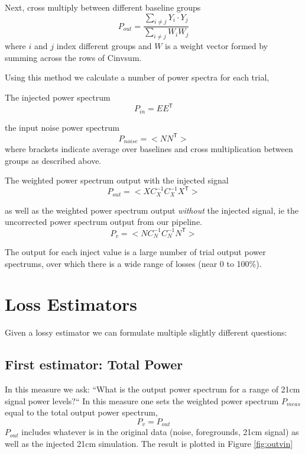 \documentclass{article}
\begin{document}
Next, cross multiply between different baseline groups
\begin{equation}
P_{out} = \frac{\sum_{i\neq j} Y_i \cdot Y_j }{\sum_{i\neq j} W_i W_j}
\end{equation}
where $i$ and $j$ index different groups and $W$ is a weight vector formed by summing across the rows of Cinvsum.


Using this method we calculate a number of power spectra for each trial,

The injected power spectrum 
\begin{equation}
P_{in} = E E^\mathsf{T}
\end{equation}

the input noise power spectrum  
\begin{equation}
P_{noise} = < N N^\mathsf{T} >
\end{equation}
where brackets indicate average over baselines and cross multiplication between groups as described above.


The weighted power spectrum output with the injected signal 
\begin{equation}
P_{out} = < X C_X^{-1} C_X^{-1} X^\mathsf{T} >
\end{equation}

as well as the weighted power spectrum output \emph{without} the injected signal, ie the uncorrected power spectrum output from our pipeline.
\begin{equation}
P_{v} = < N C_N^{-1} C_N^{-1} N^\mathsf{T} >
\end{equation}



The output for each inject value is a large number of trial output power spectrums, over which there is a wide range of losses (near 0 to 100\%).  

\section*{Loss Estimators}

Given a lossy estimator we can formulate multiple slightly different questions:
\subsection*{First estimator: Total Power} 
In this measure we ask: ``What is the output power spectrum for a range of 21cm signal power levels?`` In this measure one sets the weighted power spectrum $P_{meas}$ equal to the total output power spectrum,
\begin{equation}
P_{v} = P_{out} 
\end{equation}
$P_{out}$ includes whatever is in the original data (noise, foregrounds, 21cm signal) as well as the injected 21cm simulation.  The result is plotted in Figure \ref{fig:outvin}
\end{document}
